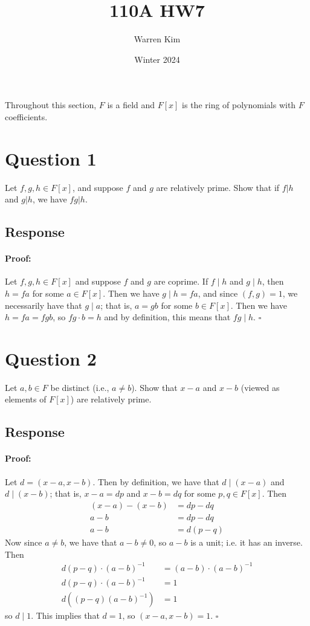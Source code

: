 \documentclass [12pt] {article}
\title{110A HW7}
\author{Warren Kim}
\date{Winter 2024}
\newenvironment{proof}{\paragraph{Proof:}}{\hfill$\square$}
\begin{document}
\maketitle

Throughout this section, $F$ is a field and $F[x]$ is the ring of polynomials with $F$ coefficients.

\section*{Question 1}
Let $f,g,h\in F[x]$, and suppose $f$ and $g$ are relatively prime. Show that if $f|h$ and $g|h$, we
have $fg|h$.

\subsection*{Response}
\begin{proof}
    Let $f, g, h \in F[x]$ and suppose $f$ and $g$ are coprime. If $f \mid h$ and
    $g \mid h$, then $h = fa$ for some $a \in F[x]$. Then we have $g \mid h = fa$, and since
    $(f, g) = 1$, we necessarily have that $g \mid a$; that is, $a = gb$ for some $b \in F[x]$.
    Then we have $h = fa = fgb$, so $fg \cdot b = h$ and by definition, this means that $fg \mid h$.
\end{proof}
\newpage

\section*{Question 2}
Let $a,b\in F$ be distinct (i.e., $a\neq b$). Show that $x-a$ and $x-b$ (viewed as elements of
$F[x]$) are relatively prime.

\subsection*{Response}
\begin{proof}
    Let $d = (x - a, x - b)$. Then by definition, we have that $d \mid (x - a)$ and
    $d \mid (x - b)$; that is, $x - a = dp$ and $x - b = dq$ for some $p, q \in F[x]$. Then
    \begin{align*}
        (x - a) - (x - b) &= dp - dq \\
        a - b &= dp - dq \\
        a - b &= d(p - q)
    \end{align*}
    Now since $a \neq b$, we have that $a - b \neq 0$, so $a - b$ is a unit; i.e. it has an inverse.
    Then
    \begin{align*}
        d(p - q) \cdot (a - b)^{-1} &= (a - b) \cdot (a - b)^{-1} \\
        d(p - q) \cdot (a - b)^{-1} &= 1 \\
        d\left((p - q)(a - b)^{-1}\right) &= 1
    \end{align*}
    so $d \mid 1$. This implies that $d = 1$, so $(x - a, x - b) = 1$.
\end{proof}
\newpage
\end{document}
